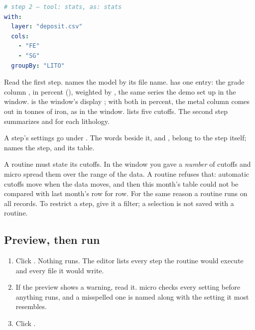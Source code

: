 \begin{lstlisting}[language=yaml]
# step 2 — tool: stats, as: stats
with:
  layer: "deposit.csv"
  cols:
    - "FE"
    - "SG"
  groupBy: "LITO"
\end{lstlisting}


Read the first step.  names the model by its file name.  has one entry: the grade column , in percent (), weighted by , the same series the demo set up in the window.  is the window's display ; with both in percent, the metal column comes out in tonnes of iron, as in the window.  lists five cutoffs. The second step summarizes  and  for each lithology.

A step's settings go under . The words beside it,  and , belong to the step itself;  names the step, and its table.

\begin{caution}
A routine must state its cutoffs. In the window you gave a \emph{number} of cutoffs and micro spread them over the range of the data. A routine refuses that: automatic cutoffs move when the data moves, and then this month's table could not be compared with last month's row for row. For the same reason a routine runs on all records. To restrict a step, give it a filter; a selection is not saved with a routine.
\end{caution}

\subsection{Preview, then run}
\begin{tryit}
\begin{enumerate}
\item Click . Nothing runs. The editor lists every step the routine would execute and every file it would write.
\item If the preview shows a warning, read it. micro checks every setting before anything runs, and a misspelled one is named along with the setting it most resembles.
\item Click .
\end{enumerate}
\end{tryit}

